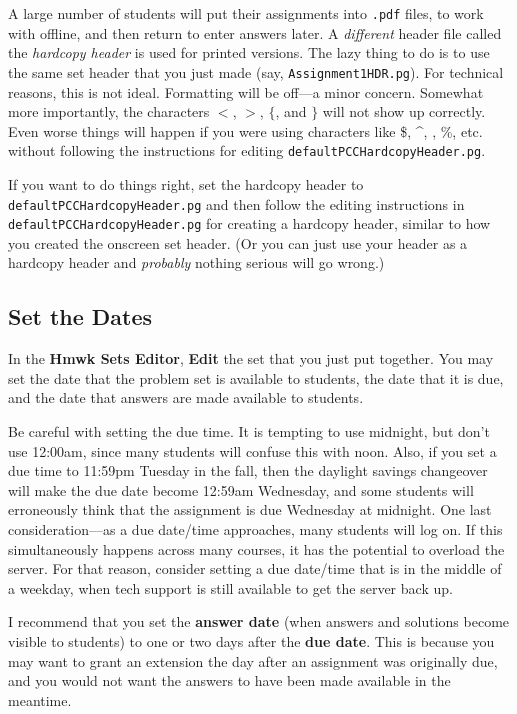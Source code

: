 \documentclass[12pt]{article}
\newcommand{\menu}[1]{\textbf{#1}}
\newcommand{\HSE}{\menu{Hmwk Sets Editor}}
\begin{document}
A large number of students will put their assignments into \texttt{.pdf} files, to work with offline, and then return to enter answers later.  A \emph{different} header file called the \emph{hardcopy header} is used for printed versions.  The lazy thing to do is to use the same set header that you just made (say, \texttt{Assignment1HDR.pg}).  For technical reasons, this is not ideal. Formatting will be off---a minor concern.  Somewhat more importantly, the characters $<$, $>$, $\{$, and $\}$ will not show up correctly.  Even worse things will happen if you were using characters like \$, \^{}, \textunderscore, \%, etc. without following the instructions for editing \texttt{defaultPCCHardcopyHeader.pg}. 

If you want to do things right, set the hardcopy header to \texttt{defaultPCCHardcopyHeader.pg} and then follow the editing instructions in \texttt{defaultPCCHardcopyHeader.pg} for creating a hardcopy header, similar to how you created the onscreen set header. (Or you can just use your header as a hardcopy header and \emph{probably} nothing serious will go wrong.)

\subsection{Set the Dates} In the \HSE, \menu{Edit} the set that you just put together.  You may set the date that the problem set is available to students, the date that it is due, and the date that answers are made available to students.

Be careful with setting the due time.  It is tempting to use midnight, but don't use 12:00{\sc am}, since many students will confuse this with noon.  Also, if you set a due time to 11:59{\sc pm} Tuesday in the fall, then the daylight savings changeover will make the due date become 12:59{\sc am} Wednesday, and some students will erroneously think that the assignment is due Wednesday at midnight.  One last consideration---as a due date/time approaches, many students will log on. If this simultaneously happens across many courses, it has the potential to overload the server. For that reason, consider setting a due date/time that is in the middle of a weekday, when tech support is still available to get the server back up.

I recommend that you set the \menu{answer date} (when answers and solutions become visible to students) to one or two days after the \menu{due date}.  This is because you may want to grant an extension the day after an assignment was originally due, and you would not want the answers to have been made available in the meantime.
\end{document}

